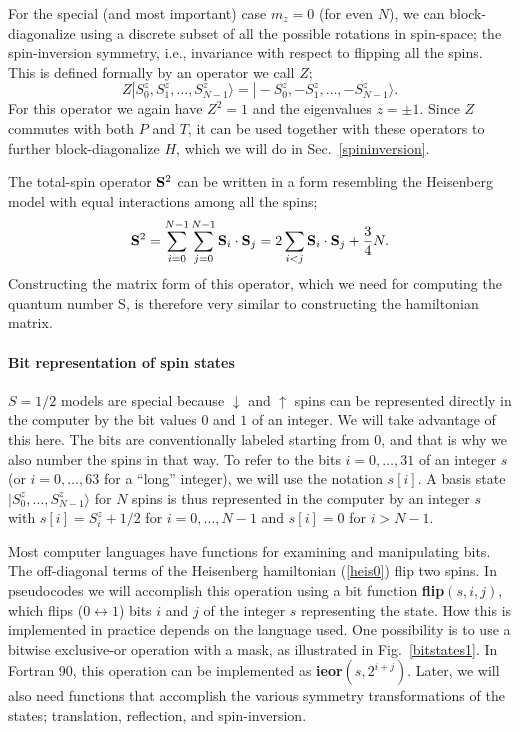 \documentclass[draft,numberedheadings]{aipproc}
\newcommand{\dn}{\downarrow}
\newcommand{\up}{\uparrow}
\begin{document}
For the special (and most important) case $m_z=0$ (for even $N$), 
we can block-diagonalize using a discrete subset of all the possible rotations in spin-space; the spin-inversion 
symmetry, i.e., invariance with respect to flipping all the spins. This is defined formally by an operator we call $Z$;
\begin{equation}
Z|S^z_0,S^z_1,\ldots,S^z_{N-1}\rangle=|-S^z_0,-S^z_1,\ldots,-S^z_{N-1}\rangle .
\label{zdef}
\end{equation}
For this operator we again have $Z^2=1$ and the eigenvalues $z=\pm 1$. Since $Z$ commutes with both $P$ and $T$, it can be used together with these operators 
to further block-diagonalize $H$, which we will do in Sec.~\ref{spininversion}.

The total-spin operator ${\bf S}^2$ can be written in a form resembling the Heisenberg model with equal interactions among all the spins;
\begin{equation}
{\bf S}^2 = \sum_{i=0}^{N-1}\sum_{j=0}^{N-1} {\bf S}_i\cdot {\bf S}_{j} = 
2\sum_{i<j} {\bf S}_i\cdot {\bf S}_{j} + \frac{3}{4}N.
\label{ssquared}
\end{equation}
Constructing the matrix form of this operator, which we need for computing the quantum number S, is therefore very similar to constructing 
the hamiltonian matrix.

\paragraph{Bit representation of spin states}

$S=1/2$ models are special because $\dn$ and $\up$ spins can be represented directly in the computer by the bit values $0$ and $1$ of an integer. We will 
take advantage of this here. The bits are conventionally labeled starting from $0$, and that is why we also number the spins in that way. To refer 
to the bits $i=0,\ldots,31$ of an integer $s$ (or $i=0,\ldots,63$ for a ``long'' integer), we will use the notation $s[i]$. A basis state 
$|S^z_0,\ldots,S^z_{N-1}\rangle$ for $N$ spins is thus represented in the computer by an integer $s$ with $s[i]=S^z_{i}+1/2$ for $i=0,\ldots,N-1$ 
and $s[i]=0$ for $i>N-1$. 

Most computer languages have functions for examining and manipulating bits. The off-diagonal terms of the Heisenberg hamiltonian (\ref{heis0}) 
flip two spins. In pseudocodes we will accomplish this operation using a bit function {\bf flip}$(s,i,j)$, which flips ($0\leftrightarrow 1$) bits 
$i$ and $j$ of the integer $s$ representing the state. How this is implemented in practice depends on the language used. One possibility is to use a bitwise 
exclusive-or operation with a mask, as illustrated in Fig.~\ref{bitstates1}. In Fortran 90, this operation can be implemented as {\bf ieor}$(s,2^{i+j})$.
Later, we will also need functions that accomplish the various symmetry transformations of the states; translation, reflection, and spin-inversion. 
\end{document}
